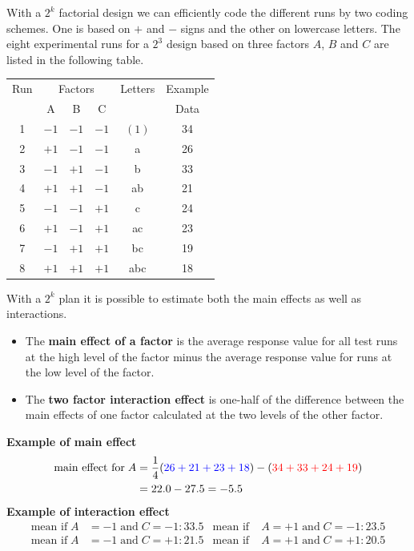 With a $2^k$ factorial design we can efficiently code the different runs by two coding schemes. One is based on $+$ and $-$ signs and the other on lowercase letters. The eight experimental runs for a $2^3$ design based on three factors $A$, $B$ and $C$ are listed in the following table.
\begin{table}[H]
  \centering
  \scriptsize
  \begin{tabular}{c|ccc|c|c}
    Run & \multicolumn{3}{c}{Factors} & Letters & Example\\
      & A    & B    & C               &         & Data\\ \hline
    1 & $-1$ & $-1$ & $-1$            & $( 1)$  & \color{red}  34 \\
    2 & $+1$ & $-1$ & $-1$            & a       & \color{blue} 26 \\
    3 & $-1$ & $+1$ & $-1$            & b       & \color{red}  33 \\
    4 & $+1$ & $+1$ & $-1$            & ab      & \color{blue} 21 \\
    5 & $-1$ & $-1$ & $+1$            & c       & \color{red}  24 \\
    6 & $+1$ & $-1$ & $+1$            & ac      & \color{blue} 23 \\
    7 & $-1$ & $+1$ & $+1$            & bc      & \color{red}  19 \\
    8 & $+1$ & $+1$ & $+1$            & abc     & \color{blue} 18 \\
  \end{tabular}
\end{table}
With a $2^k$ plan it is possible to estimate both the main effects as well as interactions.
\begin{itemize}
  \item The \textbf{main effect of a factor} is the average response value for all test runs at the high level of the factor minus the average response value for runs at the low level of the factor.
  \item The \textbf{two factor interaction effect} is one-half of the difference between the main effects of one factor calculated at the two levels of the other factor.
\end{itemize}

\textbf{Example of main effect}
\begin{equation}
  \begin{split}
    \text{main effect for}\; A &= \frac{1}{4}(\color{blue}26+21+23+18\color{black})-(\color{red}34+33+24+19\color{black})\\
    &= 22.0-27.5 = -5.5
  \end{split}
\end{equation}
\textbf{Example of interaction effect}
\begin{align*}
  \text{mean if}\; A&=-1 \;\text{and}\; C=-1: 33.5 & \text{mean if}\; &A=+1 \;\text{and}\; C=-1: 23.5 \\
  \text{mean if}\; A&=-1 \;\text{and}\; C=+1: 21.5 & \text{mean if}\; &A=+1 \;\text{and}\; C=+1: 20.5
\end{align*}


